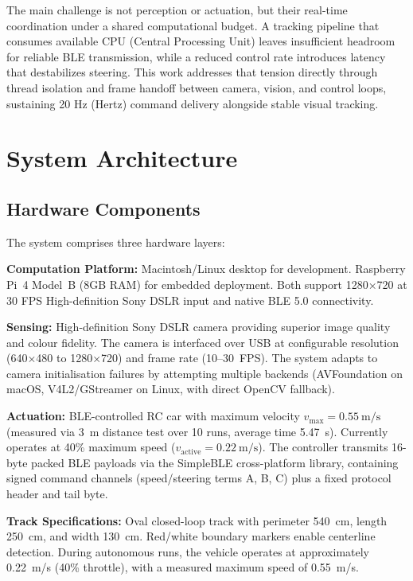 \documentclass[twocolumn]{article}
\begin{document}
The main challenge is not perception or actuation, but their real-time coordination under a shared computational budget. A tracking pipeline that consumes available CPU (Central Processing Unit) leaves insufficient headroom for reliable BLE transmission, while a reduced control rate introduces latency that destabilizes steering. This work addresses that tension directly through thread isolation and frame handoff between camera, vision, and control loops, sustaining 20 Hz (Hertz) command delivery alongside stable visual tracking.

\section{System Architecture}

\subsection{Hardware Components}

The system comprises three hardware layers:

\textbf{Computation Platform:} Macintosh/Linux desktop for development. Raspberry Pi~4 Model~B (8GB RAM) for embedded deployment. Both support 1280×720 at 30 FPS High-definition Sony DSLR  input and native BLE 5.0 connectivity.

\textbf{Sensing:} High-definition Sony DSLR camera providing superior image quality and colour fidelity. The camera is interfaced over USB at configurable resolution (640$\times$480 to 1280$\times$720) and frame rate (10--30~FPS). The system adapts to camera initialisation failures by attempting multiple backends (AVFoundation on macOS, V4L2/GStreamer on Linux, with direct OpenCV fallback).

\textbf{Actuation:} BLE-controlled RC car with maximum velocity $v_{\max} = 0.55~\text{m/s}$ (measured via 3~m distance test over 10 runs, average time 5.47~s). Currently operates at 40\% maximum speed ($v_{\text{active}} = 0.22~\text{m/s}$). The controller transmits 16-byte packed BLE payloads via the SimpleBLE cross-platform library, containing signed command channels (speed/steering terms A, B, C) plus a fixed protocol header and tail byte.

\textbf{Track Specifications:} Oval closed-loop track with perimeter 540~cm, length 250~cm, and width 130~cm. Red/white boundary markers enable centerline detection. During autonomous runs, the vehicle operates at approximately 0.22~m/s (40\% throttle), with a measured maximum speed of 0.55~m/s.
\end{document}
